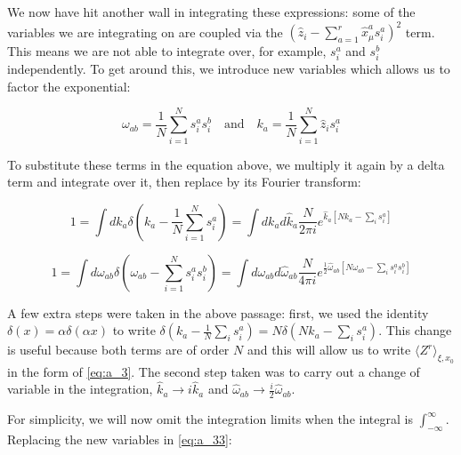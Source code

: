 We now have hit another wall in integrating these expressions: some of
the variables we are integrating on are coupled via the
$\left(\hat{z}_i - \sum_{a=1}^r \hat{x}_\mu^a s_i^a \right)^2$
term. This means we are not able to integrate over, for example,
$s_i^a$ and $s_i^b$ independently. To get around this, we introduce new variables which allows us to factor the exponential:

\begin{equation}
  \label{eq:a_36}
  \omega_{ab} = \frac{1}{N} \sum_{i=1}^N s_i^a s_i^b \quad \text{and}
  \quad k_a = \frac{1}{N} \sum_{i=1}^N \hat{z}_i s_i^a
\end{equation}

To substitute these terms in the equation above, we multiply it again by a delta term and integrate over it, then replace by its Fourier transform:

\begin{equation}
  \label{eq:a_k}
  1 = \int dk_{a} \delta\left(k_a -
    \frac{1}{N}\sum_{i=1}^N s_i^a\right) = \int dk_a
  d\hat{k}_a \frac{N}{2\pi i} e^{\hat{k}_{a} [N k_a - \sum_i
      s_i^a]}  
\end{equation}

\begin{equation}
  \label{eq:a_37}
  1 = \int d\omega_{ab} \delta\left(\omega_{ab} -
    \sum_{i=1}^N s_i^a s_i^b\right) = \int d\omega_{ab}
  d\hat{\omega}_{ab} \frac{N}{4\pi i} e^{\frac{1}{2}\hat{\omega}_{ab} [N \omega_{ab} - \sum_i
      s_i^a s_i^b]}
\end{equation}


A few extra steps were taken in the above passage: first, we used the identity $\delta(x) = \alpha \delta(\alpha x)$ to write $\delta(k_a - \frac{1}{N} \sum_i s_i^a) = N \delta(N k_a - \sum_i s_i^a)$. This change is useful because both terms are of order $N$ and this will allow us to write $\langle Z^r \rangle_{\xi, x_0}$ in the form of \eqref{eq:a_3}. The second step taken was to carry out a change of variable in the integration, $\hat{k}_a \to i\hat{k}_a$ and $\hat{\omega}_{ab} \to \frac{i}{2} \hat{\omega}_{ab}$.

For simplicity, we will now omit the integration limits when the integral is $\int_{-\infty}^\infty$. Replacing the new variables in \eqref{eq:a_33}:

